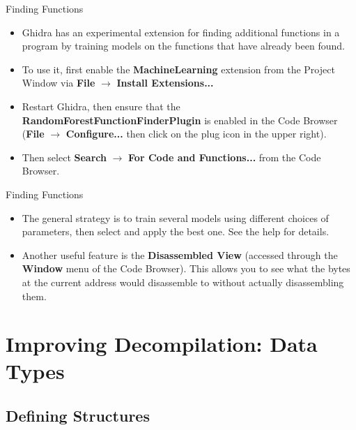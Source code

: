 \documentclass{beamer}
\begin{document}
\begin{frame}
\begin{block}{Finding Functions}
\begin{itemize}
\item Ghidra has an experimental extension for finding additional functions in a program by training models on the functions that have already been found.
\item To use it, first enable the \textbf{MachineLearning} extension from the Project Window via \textbf{File} $\rightarrow$ \textbf{Install Extensions...}
\item Restart Ghidra, then ensure that the \textbf{RandomForestFunctionFinderPlugin} is enabled in the Code Browser 
(\textbf{File} $\rightarrow$ \textbf{Configure...} then click on the plug icon in the upper right). 
\item Then select \textbf{Search} $\rightarrow$ \textbf{For Code and Functions...} from the Code Browser.
\end{itemize}
\end{block}
\end{frame}


\begin{frame}
\begin{block}{Finding Functions}
\begin{itemize}
\item The general strategy is to train several models using different choices of parameters, then select and apply the best one.  See the help for details.
\item Another useful feature is the \textbf{Disassembled View} (accessed through the \textbf{Window} menu of the Code Browser).  This allows you to see what the bytes at the current
address would disassemble to without actually disassembling them.
\end{itemize}
\end{block}
\end{frame}


\section{Improving Decompilation: Data Types}

\subsection{Defining Structures}
\end{document}
